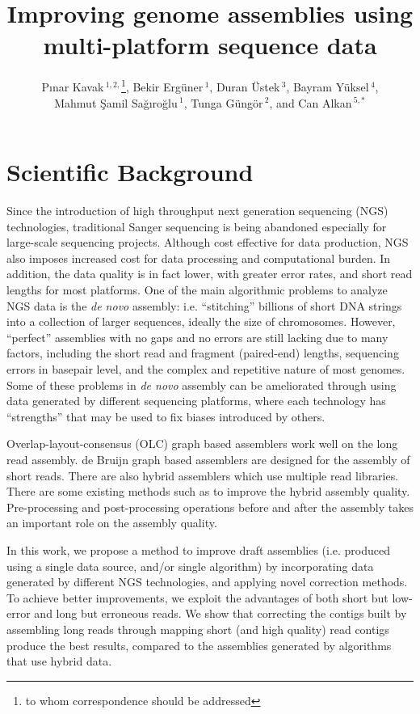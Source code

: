 \documentclass[12pt,a4paper]{cibb}
\title{\large $\ $\\ \bf Improving genome assemblies using multi-platform sequence data}
\author{ P\i nar Kavak\,$^{1,2,}$\footnote{to whom correspondence should be addressed},  Bekir Erg\"{u}ner\,$^{1}$,  Duran \"{U}stek\,$^{3}$,  Bayram Y\"{u}ksel\,$^{4}$, \\
  Mahmut \c{S}amil Sa\u{g}\i ro\u{g}lu\,$^1$, 
  Tunga G\"{u}ng\"{o}r\,$^{2}$, and 
  Can Alkan\,$^{5,*}$}
\begin{document}
\thispagestyle{myheadings}
\pagestyle{myheadings}

\section{\bf Scientific Background}

Since the introduction of high throughput next generation sequencing (NGS) technologies, traditional Sanger sequencing is being abandoned especially for large-scale sequencing projects.
Although cost effective for data production, NGS also imposes increased cost for data processing and computational burden. 
In addition, the data quality is in fact lower, with greater error rates, and short read lengths for most platforms. 
One of the main algorithmic problems to analyze NGS data is the \textit{de novo} assembly: i.e. ``stitching'' billions of short DNA strings into a collection of larger sequences, ideally the size of chromosomes. 
However, ``perfect'' assemblies with no gaps and no errors are still lacking due to many factors, including the short read and fragment (paired-end) lengths, sequencing errors in basepair level, and the complex and repetitive nature of most genomes. 
Some of these problems in \textit{de novo} assembly can be ameliorated through using data generated by different sequencing platforms, where each technology has ``strengths'' that may be used to fix biases introduced by others.

Overlap-layout-consensus (OLC) graph based assemblers \cite{celera:2000, sga:2012} work well on the long read assembly. de Bruijn graph based assemblers \cite{velvetZerbino:2008, spadesBankevich:2012, allpaths:2008} are designed for the assembly of short reads. 
There are also hybrid assemblers \cite{cabogMiller:2008, masurcaZimin:2013, mira} which use multiple read libraries. There are some existing methods such as \cite{wang:2012} to improve the hybrid assembly quality.
Pre-processing and post-processing operations before and after the assembly takes an important role on the assembly quality.

In this work, we propose a method to improve draft assemblies (i.e. produced using a single data source, and/or single algorithm) by incorporating data generated by different NGS technologies, and applying novel correction methods. To achieve better improvements, we exploit the advantages of both short but low-error and long but erroneous reads. 
We show that correcting the contigs built by assembling long reads through mapping short (and high quality) read contigs produce the best results, compared to the assemblies generated by algorithms that use hybrid data.
\end{document}
